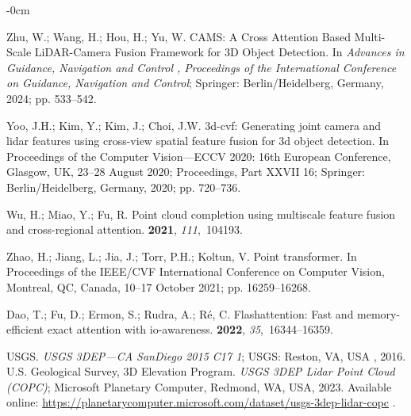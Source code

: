 \documentclass[remotesensing,article,accept,pdftex,moreauthors]{Definitions/mdpi}
\renewcommand{\hl}[1]{#1}
\begin{document}
\begin{adjustwidth}{-\extralength}{0cm}
\begin{thebibliography}{999}
Zhu, W.; Wang, H.; Hou, H.; Yu, W.
\newblock CAMS: A Cross Attention Based Multi-Scale LiDAR-Camera Fusion
  Framework for 3D Object Detection.
\newblock In \emph{\hl{Advances in Guidance, Navigation and Control}%
, Proceedings of the International Conference on Guidance,
  Navigation and Control}; Springer: \hl{Berlin/Heidelberg, Germany}, 2024; pp. 533--542.

Yoo, J.H.; Kim, Y.; Kim, J.; Choi, J.W.
\newblock 3d-cvf: Generating joint camera and lidar features using cross-view
  spatial feature fusion for 3d object detection.
\newblock In Proceedings of the Computer Vision---ECCV 2020: 16th European  Conference, Glasgow, UK, 23--28 August 2020; Proceedings, Part XXVII 16; Springer: \hl{Berlin/Heidelberg, Germany}, 2020; pp. 720--736.

Wu, H.; Miao, Y.; Fu, R.
\newblock Point cloud completion using multiscale feature fusion and
  cross-regional attention.
 {\bf 2021}, {\em 111},~104193.

Zhao, H.; Jiang, L.; Jia, J.; Torr, P.H.; Koltun, V.
\newblock Point transformer.
\newblock In Proceedings of the IEEE/CVF International
  Conference on Computer Vision, \hl{Montreal, QC, Canada, 10--17 October} 2021; pp. 16259--16268.

Dao, T.; Fu, D.; Ermon, S.; Rudra, A.; R{\'e}, C.
\newblock Flashattention: Fast and memory-efficient exact attention with
  io-awareness.
 {\bf 2022},
  {\em 35},~16344--16359.

{USGS}.
\newblock \emph{{USGS} 3DEP---{CA} {SanDiego} 2015 C17 1}; \hl{USGS: Reston, VA, USA}%
, 2016.
{U.S. Geological Survey, 3D Elevation Program}.
\newblock \emph{USGS 3DEP Lidar Point Cloud (COPC)};
\newblock Microsoft Planetary Computer, Redmond, WA, USA, 2023. Available online: \url{https://planetarycomputer.microsoft.com/dataset/usgs-3dep-lidar-copc}
.


\end{thebibliography}
\end{adjustwidth}
\end{document}
